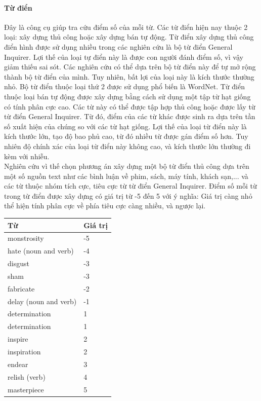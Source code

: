 \paragraph*{Từ điển}
Đây là công cụ giúp tra cứu điểm số của mỗi từ. Các từ điển hiện nay thuộc 2 loại: xây dựng thủ công hoặc xây dựng bán tự động. Từ điển xây dựng thủ công điển hình được sử dụng nhiều trong các nghiên cứu là bộ từ điển General Inquirer. Lợi thế của loại tự điển này là được con người đánh điểm số, vì vậy giảm thiếu sai sót. Các nghiên cứu có thể dựa trên bộ từ điển này để tự mở rộng thành bộ từ điển của mình. Tuy nhiên, bất lợi của loại này là kích thước thường nhỏ. Bộ từ điển thuộc loại thứ 2 được sử dụng phổ biến là WordNet. Từ điển thuộc loại bán tự động được xây dựng bằng cách sử dụng một tập từ hạt giống có tính phân cực cao. Các từ này có thể được tập hợp thủ công hoặc được lấy từ từ điển General Inquirer. Từ đó, điểm của các từ khác được sinh ra dựa trên tần số xuất hiện của chúng so với các từ hạt giống. Lợi thế của loại từ điển này là kích thước lớn, tạo độ bao phủ cao, từ đó nhiều từ được gán điểm số hơn. Tuy nhiên độ chính xác của loại từ điển này không cao, và kích thước lớn thường đi kèm với nhiễu. \\

Nghiên cứu \cite{taboada2011lexicon} vì thế chọn phương án xây dựng một bộ từ điển thủ công dựa trên một số nguồn text như các bình luận về phim, sách, máy tính, khách sạn,... và các từ thuộc nhóm tích cực, tiêu cực từ từ điển General Inquirer. Điểm số mỗi từ trong từ điển được xây dựng có giá trị từ -5 đến 5 với ý nghĩa: Giá trị càng nhỏ thể hiện tính phân cực về phía tiêu cực càng nhiều, và ngược lại. 
\begin{table}[H]
\begin{tabular}{l l}
\hline
\textbf{Từ} & \textbf{Giá trị} 
\\ \hline
monstrosity & -5
\\ 
hate (noun and verb) & -4
\\ 
disgust & -3
\\ 
sham & -3
\\ 
fabricate & -2
\\ 
delay (noun and verb) & -1
\\
determination & 1
\\
determination & 1
\\ 
inspire & 2
\\ 
inspiration & 2
\\ 
endear & 3
\\ 
relish (verb) & 4
\\ 
masterpiece & 5
\\ \hline
\end{tabular}
\end{table}
